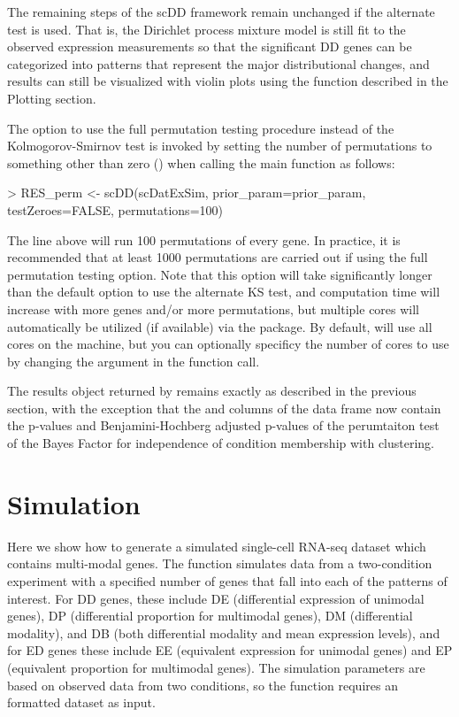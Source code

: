 \documentclass{article}
\begin{document}
The remaining steps of the scDD framework remain unchanged if the alternate test is used.  That is, the Dirichlet process mixture model is still fit to the observed expression measurements so that the significant DD genes can be categorized into patterns that represent the major distributional changes, and results can still be visualized with violin plots using the  function described in the Plotting section.  

The option to use the full permutation testing procedure instead of the Kolmogorov-Smirnov test is invoked by setting the number of permutations to something other than zero () when calling the main  function as follows:

\begin{Schunk}
\begin{Sinput}
> RES_perm <- scDD(scDatExSim, prior_param=prior_param, testZeroes=FALSE, permutations=100)
\end{Sinput}
\end{Schunk}

The line above will run 100 permutations of every gene.   In practice, it is recommended that at least 1000 permutations are carried out if using the full permutation testing option.  Note that this option will take significantly longer than the default option to use the alternate KS test, and computation time will increase with more genes and/or more permutations, but multiple cores will automatically be utilized (if available) via the  package.  By default,  will use all cores on the machine, but you can optionally specificy the number of cores to use by changing the  argument in the  function call.

The results object returned by  remains exactly as described in the previous section, with the exception that the  and  columns of the  data frame now contain the p-values and Benjamini-Hochberg adjusted p-values of the perumtaiton test of the Bayes Factor for independence of condition membership with clustering. 

\section{Simulation}

Here we show how to generate a simulated single-cell RNA-seq dataset which contains multi-modal genes.  The  function simulates data from a two-condition experiment with a specified number of genes that fall into each of the patterns of interest.  For DD genes, these include DE (differential expression of unimodal genes), DP (differential proportion for multimodal genes), DM (differential modality), and DB (both differential modality and mean expression levels), and for ED genes these include EE (equivalent expression for unimodal genes) and EP (equivalent proportion for multimodal genes).  The simulation parameters are based on observed data from two conditions, so the function requires an  formatted dataset as input.
\end{document}
